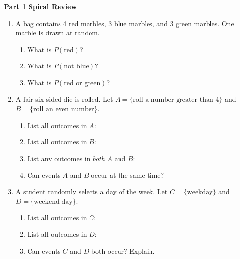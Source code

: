\documentclass[10pt]{article}
\begin{document}
\namedateperiod

\vspace{0.3in}

{\large\bfseries\color{navy} Part 1 \quad Spiral Review}

\vspace{0.12in}

\begin{enumerate}

    \item A bag contains 4 red marbles, 3 blue marbles, and 3 green marbles.
    One marble is drawn at random.
    \begin{enumerate}[label=(\alph*), itemsep=6pt]
        \item What is $P(\text{red})$? \blank{4cm}
        \item What is $P(\text{not blue})$? \blank{4cm}
        \item What is $P(\text{red or green})$? \blank{4cm}
    \end{enumerate}

    \vspace{0.18in}

    \item A fair six-sided die is rolled. Let $A = \{\text{roll a number greater than 4}\}$
    and $B = \{\text{roll an even number}\}$.
    \begin{enumerate}[label=(\alph*), itemsep=6pt]
        \item List all outcomes in $A$: \blank{5cm}
        \item List all outcomes in $B$: \blank{5cm}
        \item List any outcomes in \emph{both} $A$ and $B$: \blank{4cm}
        \item Can events $A$ and $B$ occur at the same time? \blank{3cm}
    \end{enumerate}

    \vspace{0.18in}

    \item A student randomly selects a day of the week.
    Let $C = \{\text{weekday}\}$ and $D = \{\text{weekend day}\}$.
    \begin{enumerate}[label=(\alph*), itemsep=6pt]
        \item List all outcomes in $C$: \blank{7cm}
        \item List all outcomes in $D$: \blank{5cm}
        \item Can events $C$ and $D$ both occur? Explain.\\
        \writeline\writeline
    \end{enumerate}

\end{enumerate}
\end{document}

